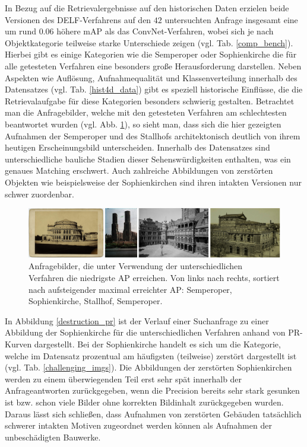 In Bezug auf die Retrievalergebnisse auf den historischen Daten erzielen beide Versionen des DELF-Verfahrens auf den $42$ untersuchten Anfrage insgesamt eine um rund $0.06$ höhere mAP als das ConvNet-Verfahren, wobei sich je nach Objektkategorie teilweise starke Unterschiede zeigen (vgl. Tab. \ref{comp_bench}). Hierbei gibt es einige Kategorien wie die Semperoper oder Sophienkirche die für alle getesteten Verfahren eine besonders große Herausforderung darstellen. Neben Aspekten wie Auflösung, Aufnahmequalität und Klassenverteilung innerhalb des Datensatzes (vgl. Tab. \ref{hist4d_data}) gibt es speziell historische Einflüsse, die die Retrievalaufgabe für diese Kategorien besonders schwierig gestalten. Betrachtet man die Anfragebilder, welche mit den getesteten Verfahren am schlechtesten beantwortet wurden (vgl. Abb. \ref{worst_queries}), so sieht man, dass sich die hier gezeigten Aufnahmen der Semperoper und des Stallhofs architektonisch deutlich von ihrem heutigen Erscheinungsbild unterscheiden. Innerhalb des Datensatzes sind unterschiedliche bauliche Stadien dieser Sehenswürdigkeiten enthalten, was ein genaues Matching erschwert. Auch zahlreiche Abbildungen von zerstörten Objekten wie beispielsweise der Sophienkirchen sind ihren intakten Versionen nur schwer zuordenbar.  
\\
\begin{figure}[h]
\centering
\includegraphics[scale=0.40]{worst_queries}
\caption{Anfragebilder, die unter Verwendung der unterschiedlichen Verfahren die niedrigste AP erreichen. Von links nach rechts, sortiert nach aufsteigender maximal erreichter AP: Semperoper, Sophienkirche, Stallhof, Semperoper.}
\label{worst_queries}
\end{figure}
In Abbildung \ref{destruction_pr} ist der Verlauf einer Suchanfrage zu einer Abbildung der Sophienkirche für die unterschiedlichen Verfahren anhand von PR-Kurven dargestellt. Bei der Sophienkirche handelt es sich um die Kategorie, welche im Datensatz prozentual am häufigsten (teilweise) zerstört dargestellt ist (vgl. Tab. \ref{challenging_imgs}). Die Abbildungen der zerstörten Sophienkirchen werden zu einem überwiegenden Teil erst sehr spät innerhalb der Anfrageantworten zurückgegeben, wenn die Precision bereits sehr stark gesunken ist bzw. schon viele Bilder ohne korrekten Bildinhalt zurückgegeben wurden. Daraus lässt sich schließen, dass Aufnahmen von zerstörten Gebäuden tatsächlich schwerer intakten Motiven zugeordnet werden können als Aufnahmen der unbeschädigten Bauwerke.
